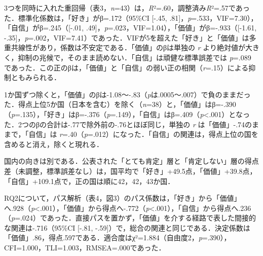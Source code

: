 \documentclass[a4paper,10pt,twocolumn]{ltjsarticle}
\begin{document}
3つを同時に入れた重回帰（表3，\textit{n}=43）は，\textit{R}²=.60，調整済み\textit{R}²=.57であった．標準化係数は，「好き」がβ=.172（95\%CI [-.45, .81]，\textit{p}=.533，VIF=7.30），「自信」がβ=.245（[-.01, .49]，\textit{p}=.023，VIF=1.04），「価値」がβ=-.933（[-1.61, -.35]，\textit{p}=.002，VIF=7.41）であった．VIFが5を超えた「好き」と「価値」は多重共線性があり，係数は不安定である．「価値」のβは単独の \textit{r} より絶対値が大きく，抑制の兆候で，そのまま読めない．「自信」は頑健な標準誤差では \textit{p}=.089 であった．この正のβは，「価値」と「自信」の弱い正の相関（\textit{r}=.15）による抑制ともみられる．

1か国ずつ除くと，「価値」のβは-1.08〜-.83（\textit{p}は.0005〜.007）で負のままだった．得点上位5か国（日本を含む）を除く（\textit{n}=38）と，「価値」はβ=-.390（\textit{p}=.135），「好き」はβ=-.376（\textit{p}=.149），「自信」はβ=.409（\textit{p}<.001）となった．2つのβの合計は-.77で除外前の-.76とほぼ同じ，単独の \textit{r} は「価値」-.74のままで，「自信」は \textit{r}=.40（\textit{p}=.012）になった．「自信」の関連は，得点上位の国を含めると消え，除くと現れる．

国内の向きは別である．公表された「とても肯定」層と「肯定しない」層の得点差（未調整，標準誤差なし）は，国平均で「好き」+49.5点，「価値」+39.8点，「自信」+109.1点で，正の国は順に42，42，43か国．

RQ2について，パス解析（表4，図3）のパス係数は，「好き」から「価値」へ.928（\textit{p}<.001），「価値」から得点へ-.772（\textit{p}<.001），「自信」から得点へ.236（\textit{p}=.024）であった．直接パスを置かず，「価値」を介する経路で表した間接的な関連は-.716（95\%CI [-.81, -.59]）で，総合の関連と同じである．決定係数は「価値」.86，得点.597である．適合度はχ²=1.884（自由度2，\textit{p}=.390），CFI=1.000，TLI=1.003，RMSEA=.000であった．
\end{document}
